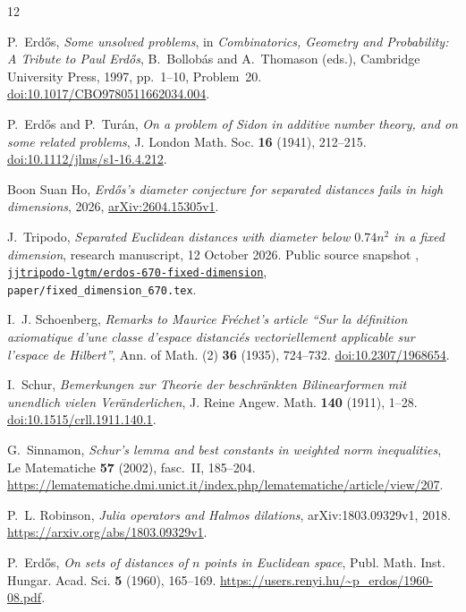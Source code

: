 \begin{thebibliography}{12}
\raggedright


P.~Erd\H{o}s,
\emph{Some unsolved problems},
in \emph{Combinatorics, Geometry and Probability: A Tribute to Paul Erd\H{o}s},
B.~Bollob\'as and A.~Thomason (eds.),
Cambridge University Press, 1997, pp.~1--10, Problem~20.
\href{https://doi.org/10.1017/CBO9780511662034.004}{doi:10.1017/CBO9780511662034.004}.

P.~Erd\H{o}s and P.~Tur\'an,
\emph{On a problem of Sidon in additive number theory, and on some related problems},
J. London Math. Soc. \textbf{16} (1941), 212--215.
\href{https://doi.org/10.1112/jlms/s1-16.4.212}{doi:10.1112/jlms/s1-16.4.212}.

Boon Suan Ho,
\emph{Erd\H{o}s's diameter conjecture for separated distances fails in high dimensions},
2026, \href{https://arxiv.org/abs/2604.15305v1}{arXiv:2604.15305v1}.

J.~Tripodo,
\emph{Separated Euclidean distances with diameter below $0.74n^2$ in a fixed dimension},
research manuscript, 12 October 2026.
Public source snapshot \TripodoCommit,
\href{https://github.com/jjtripodo-lgtm/erdos-670-fixed-dimension/tree/1e73a12ff1076dd11affadbf619ddbbef587133e}{\texttt{jjtripodo-lgtm/erdos-670-fixed-dimension}},
\texttt{paper/fixed\_dimension\_670.tex}.

I.~J. Schoenberg,
\emph{Remarks to Maurice Fr\'echet's article ``Sur la d\'efinition axiomatique d'une classe d'espace distanci\'es vectoriellement applicable sur l'espace de Hilbert''},
Ann. of Math. (2) \textbf{36} (1935), 724--732.
\href{https://doi.org/10.2307/1968654}{doi:10.2307/1968654}.

I.~Schur,
\emph{Bemerkungen zur Theorie der beschr\"ankten Bilinearformen mit unendlich vielen Ver\"anderlichen},
J. Reine Angew. Math. \textbf{140} (1911), 1--28.
\href{https://doi.org/10.1515/crll.1911.140.1}{doi:10.1515/crll.1911.140.1}.

G.~Sinnamon,
\emph{Schur's lemma and best constants in weighted norm inequalities},
Le Matematiche \textbf{57} (2002), fasc.~II, 185--204.
\url{https://lematematiche.dmi.unict.it/index.php/lematematiche/article/view/207}.

P.~L. Robinson,
\emph{Julia operators and Halmos dilations}, arXiv:1803.09329v1, 2018.
\url{https://arxiv.org/abs/1803.09329v1}.

P.~Erd\H{o}s,
\emph{On sets of distances of $n$ points in Euclidean space},
Publ. Math. Inst. Hungar. Acad. Sci. \textbf{5} (1960), 165--169.
\url{https://users.renyi.hu/~p_erdos/1960-08.pdf}.



\end{thebibliography}
